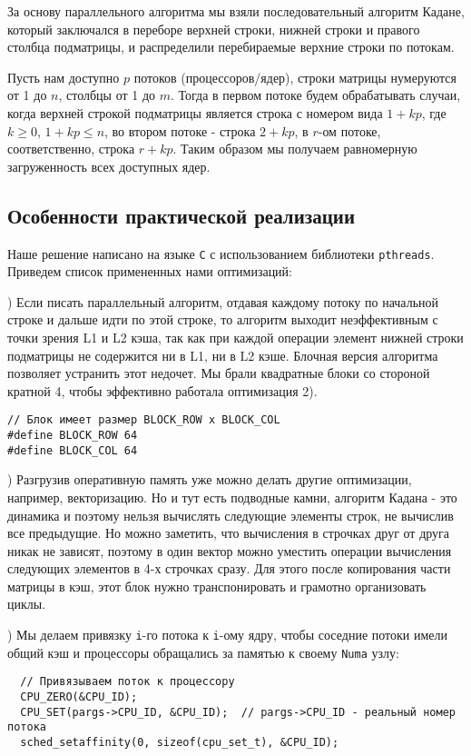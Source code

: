 \documentclass[12pt,a4paper]{article}
\begin{document}
За основу параллельного алгоритма мы взяли последовательный алгоритм Кадане, который заключался в переборе верхней строки, нижней строки и правого столбца  подматрицы, и распределили перебираемые верхние строки по потокам.

Пусть нам доступно $p$ потоков (процессоров/ядер), строки матрицы нумеруются от 1 до $n$, столбцы от 1 до $m$. Тогда в первом потоке будем обрабатывать случаи, когда верхней строкой подматрицы является строка с номером вида $1 + k p$, где $k \ge 0$, $1 + k p \le n$, во втором потоке - строка $2 + kp$, в $r$-ом потоке, соответственно, строка $r + kp$. Таким образом мы получаем равномерную загруженность всех доступных ядер.

\subsection{Особенности практической реализации}
Наше решение написано на языке \texttt{C} с использованием библиотеки \texttt{pthreads}. Приведем список примененных нами оптимизаций:

\smallskip
{}) Если писать параллельный алгоритм, отдавая каждому потоку по начальной строке и дальше идти по этой строке, то алгоритм выходит неэффективным с точки зрения L1 и L2 кэша, так как при каждой операции элемент нижней строки подматрицы не содержится ни в L1, ни в L2 кэше. Блочная версия алгоритма позволяет устранить этот недочет. Мы брали квадратные блоки со стороной кратной 4, чтобы эффективно работала оптимизация 2).
\begin{verbatim}
// Блок имеет размер BLOCK_ROW x BLOCK_COL
#define BLOCK_ROW 64
#define BLOCK_COL 64
\end{verbatim}
) Разгрузив оперативную память уже можно делать другие оптимизации, например, векторизацию. Но и тут есть подводные камни, алгоритм Кадана - это динамика и поэтому нельзя вычислять следующие элементы строк, не вычислив все предыдущие. Но можно заметить, что вычисления в строчках друг от друга никак не зависят, поэтому в один вектор можно уместить операции вычисления следующих элементов в 4-х строчках сразу. Для этого после копирования части матрицы в кэш, этот блок нужно транспонировать и грамотно организовать циклы.

) Мы делаем привязку \texttt{i}-го потока к \texttt{i}-ому ядру, чтобы соседние потоки имели общий кэш и процессоры обращались за памятью к своему \texttt{Numa} узлу:
\begin{verbatim}
  // Привязываем поток к процессору
  CPU_ZERO(&CPU_ID);
  CPU_SET(pargs->CPU_ID, &CPU_ID);  // pargs->CPU_ID - реальный номер потока
  sched_setaffinity(0, sizeof(cpu_set_t), &CPU_ID);  
\end{verbatim}
\end{document}
